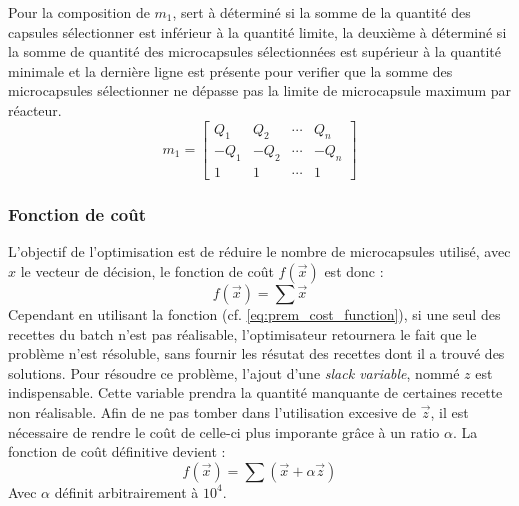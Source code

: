 Pour la composition de $m_1$, sert à déterminé si la somme de la quantité des capsules sélectionner est inférieur à la quantité limite, la deuxième à déterminé si la somme de  quantité des microcapsules sélectionnées est supérieur à la quantité minimale et la dernière ligne est présente pour verifier que la somme des microcapsules sélectionner ne dépasse pas la limite de microcapsule maximum par réacteur.
\begin{equation}
    m_1 = \left[\begin{array}{cccc}
        Q_1  & Q_2  & \cdots & Q_n\\
        -Q_1 & -Q_2 & \cdots & -Q_n\\
        1    & 1    & \cdots & 1
    \end{array}\right]
\end{equation}
\subsubsection{Fonction de coût}\label{subsubsection:fonction_de_cout}
L'objectif de l'optimisation est de réduire le nombre de microcapsules utilisé, avec $x$ le vecteur de décision, le fonction de coût $f(\overrightarrow{x} )$ est donc : 
\begin{equation}
    f\left(\overrightarrow{x}\right) = \sum \overrightarrow{x} 
    \label{eq:prem_cost_function}
\end{equation}
Cependant en utilisant la fonction (cf. \autoref{eq:prem_cost_function}), si une seul des recettes du batch n'est pas réalisable, l'optimisateur retournera le fait que le problème n'est résoluble, sans fournir les résutat des recettes dont il a trouvé des solutions. Pour résoudre ce problème, l'ajout d'une \textit{slack variable}, nommé $z$ est indispensable. Cette variable prendra la quantité manquante de certaines recette non réalisable. Afin de ne pas tomber dans l'utilisation excesive de $\overrightarrow{z}$, il est nécessaire de rendre le coût de celle-ci plus imporante grâce à un ratio $\alpha$. La fonction de coût définitive devient :
\begin{equation}
    f\left(\overrightarrow{x}\right) = \sum\left(\overrightarrow{x} + \alpha \overrightarrow{z} \right)
    \label{eq:cost_function}
\end{equation}
Avec $\alpha$ définit arbitrairement à $10^{4}$.